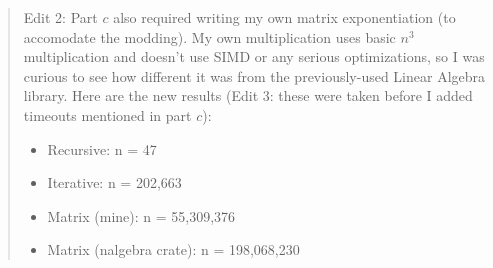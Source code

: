 \documentclass[11pt]{article}
\begin{document}
\begin{enumerate}[leftmargin=*]
\begin{enumerate}
\begin{quote}
  \medskip
  Edit 2: Part $c$ also required writing my own matrix exponentiation (to accomodate the modding). My own multiplication uses basic $n^3$ multiplication and doesn't use SIMD or any serious optimizations, so I was curious to see how different it was from the previously-used Linear Algebra library. Here are the new results (Edit 3: these were taken before I added timeouts mentioned in part $c$): 
  \begin{itemize}
    \item Recursive: n = 47
    \item Iterative: n = 202,663
    \item Matrix (mine): n = 55,309,376
    \item Matrix (nalgebra crate): n = 198,068,230
  \end{itemize}


\end{quote}
\end{enumerate}
\end{enumerate}
\end{document}
